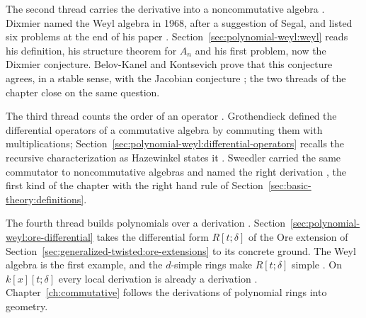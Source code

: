 The second thread carries the derivative into a noncommutative algebra
\cite[p.~209]{Dixmier1968}. Dixmier named the Weyl algebra in 1968, after
a suggestion of Segal, and listed six problems at the end of his paper
\cite[p.~241]{Dixmier1968}. Section~\ref{sec:polynomial-weyl:weyl} reads
his definition, his structure theorem for $A_{n}$ and his first problem,
now the Dixmier conjecture. Belov-Kanel and Kontsevich prove that this
conjecture agrees, in a stable sense, with the Jacobian conjecture
\cite[Theorem~1, p.~2]{BelovKanelKontsevich2007}; the two threads of the
chapter close on the same question.

The third thread counts the order of an operator
\cite[p.~4]{Hazewinkel2013}. Grothendieck defined the differential
operators of a commutative algebra by commuting them with multiplications;
Section~\ref{sec:polynomial-weyl:differential-operators} recalls the
recursive characterization as Hazewinkel states it
\cite[Theorem~6.2, p.~4]{Hazewinkel2013}. Sweedler carried the same
commutator to noncommutative algebras and named the right derivation
\cite[p.~29]{Sweedler1980}, the first kind of the chapter with the right
hand rule of Section~\ref{sec:basic-theory:definitions}.

The fourth thread builds polynomials over a derivation
\cite[p.~480]{Ore1933}.
Section~\ref{sec:polynomial-weyl:ore-differential}
takes the differential form $R[t;\delta]$ of the Ore extension of
Section~\ref{sec:generalized-twisted:ore-extensions} to its concrete
ground.
The Weyl algebra is the first example, and the $d$-simple rings make
$R[t;\delta]$ simple \cite[p.~801]{Lequain2008}.
On $k[x][t;\delta]$ every local derivation is already a derivation
\cite[Theorem~4.1, p.~4569]{Nowicki2004Local}.
Chapter~\ref{ch:commutative}
follows the derivations of polynomial rings into geometry.
